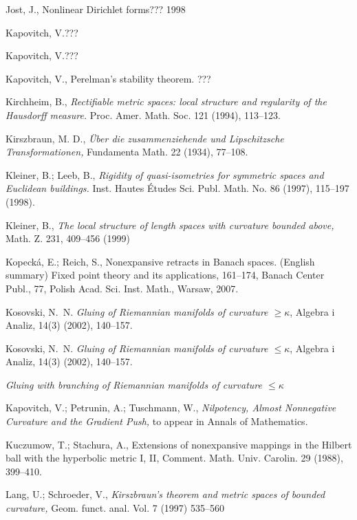\begin{thebibliography}{52}
 Jost, J., Nonlinear Dirichlet forms??? 1998

Kapovitch, V.???

Kapovitch, V.???

 Kapovitch, V.,  Perelman's stability theorem. ???

 Kirchheim, B.,  \textit{Rectifiable metric spaces: local structure and regularity of the Hausdorff measure.} Proc. Amer. Math. Soc. 121 (1994), 113--123.

 Kirszbraun, M. D., \textit{\"Uber die zusammenziehende und Lipschitzsche Transformationen,} Fundamenta Math. 22 (1934), 77--108.

  Kleiner, B.; Leeb, B., \textit{Rigidity of quasi-isometries for symmetric spaces and Euclidean buildings.} Inst. Hautes \'Etudes Sci. Publ. Math. No. 86 (1997), 115--197 (1998).

 Kleiner, B.,  \textit{The local structure of length spaces
with curvature bounded above,} Math. Z. 231, 409--456 (1999)

Kopeck\'a, E.; Reich, S.,
Nonexpansive retracts in Banach spaces. (English summary) Fixed point theory and its applications, 161--174, 
Banach Center Publ., 77, Polish Acad. Sci. Inst. Math., Warsaw, 2007. 

Kosovski, N.~N. 
\textit{Gluing of Riemannian manifolds of curvature $\geq \kappa$}, Algebra i Analiz, 14(3) (2002), 140--157.

Kosovski, N.~N. 
\textit{Gluing of Riemannian manifolds of curvature $\leq \kappa$}, Algebra i Analiz, 14(3) (2002), 140--157.

\textit{Gluing with branching of {R}iemannian manifolds of curvature $\leq \kappa$}

 Kapovitch, V.; Petrunin, A.; Tuschmann, W.,  \textit{Nilpotency, Almost Nonnegative Curvature and the Gradient Push,} to appear in Annals of Mathematics.

 Kuczumow, T.; Stachura, A., Extensions of nonexpansive mappings in
the Hilbert ball with the hyperbolic metric I, II, Comment. Math. Univ.
Carolin. 29 (1988), 399--410.

  Lang, U.; Schroeder, V., \textit{Kirszbraun's theorem and metric spaces of bounded curvature,} Geom. funct. anal.
Vol. 7 (1997) 535--560


\end{thebibliography}

